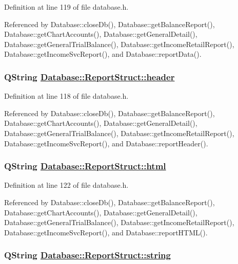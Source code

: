 Definition at line 119 of file database.h.

Referenced by Database::close\-Db(), Database::get\-Balance\-Report(), Database::get\-Chart\-Accounts(), Database::get\-General\-Detail(), Database::get\-General\-Trial\-Balance(), Database::get\-Income\-Retail\-Report(), Database::get\-Income\-Svc\-Report(), and Database::report\-Data().\hypertarget{structDatabase_1_1ReportStruct_o0}{
\subsubsection[header]{\setlength{\rightskip}{0pt plus 5cm}QString \hyperlink{structDatabase_1_1ReportStruct_o0}{Database::Report\-Struct::header}}}
\label{structDatabase_1_1ReportStruct_o0}


Definition at line 118 of file database.h.

Referenced by Database::close\-Db(), Database::get\-Balance\-Report(), Database::get\-Chart\-Accounts(), Database::get\-General\-Detail(), Database::get\-General\-Trial\-Balance(), Database::get\-Income\-Retail\-Report(), Database::get\-Income\-Svc\-Report(), and Database::report\-Header().\hypertarget{structDatabase_1_1ReportStruct_o4}{
\subsubsection[html]{\setlength{\rightskip}{0pt plus 5cm}QString \hyperlink{structDatabase_1_1ReportStruct_o4}{Database::Report\-Struct::html}}}
\label{structDatabase_1_1ReportStruct_o4}


Definition at line 122 of file database.h.

Referenced by Database::close\-Db(), Database::get\-Balance\-Report(), Database::get\-Chart\-Accounts(), Database::get\-General\-Detail(), Database::get\-General\-Trial\-Balance(), Database::get\-Income\-Retail\-Report(), Database::get\-Income\-Svc\-Report(), and Database::report\-HTML().\hypertarget{structDatabase_1_1ReportStruct_o2}{
\subsubsection[string]{\setlength{\rightskip}{0pt plus 5cm}QString \hyperlink{structDatabase_1_1ReportStruct_o2}{Database::Report\-Struct::string}}}
\label{structDatabase_1_1ReportStruct_o2}


